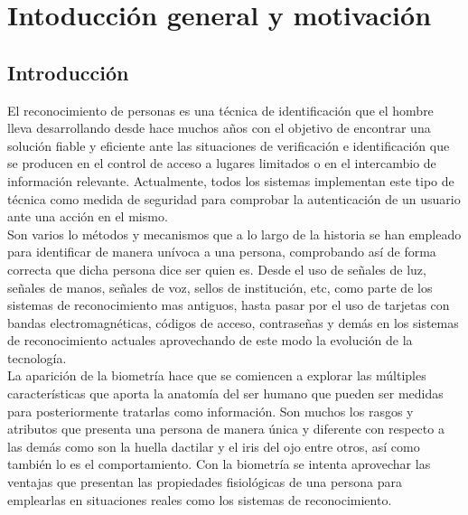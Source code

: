 
\chapter{Intoducción general y motivación} %

\label{Capítulo 1} %




\section{Introducción}
El reconocimiento de personas es una técnica de identificación que el hombre lleva desarrollando desde hace muchos años con el objetivo de encontrar una solución fiable y eficiente ante las situaciones de verificación e identificación que se producen en el control de acceso a lugares limitados o en el intercambio de información relevante. Actualmente, todos los sistemas implementan este tipo de técnica como medida de seguridad para comprobar la autenticación de un usuario ante una acción en el mismo. \\

Son varios lo métodos y mecanismos que a lo largo de la historia se han empleado para identificar de manera unívoca a una persona, comprobando así de forma correcta que dicha persona dice ser quien es. Desde el uso de señales de luz, señales de manos, señales de voz, sellos de institución, etc, como parte de los sistemas de reconocimiento mas antiguos, hasta pasar por el uso de tarjetas con bandas electromagnéticas, códigos de acceso, contraseñas y demás en los sistemas de reconocimiento actuales aprovechando de este modo la evolución de la tecnología.\\

La aparición de la biometría hace que se comiencen a explorar las múltiples características que aporta la anatomía del ser humano que pueden ser medidas para posteriormente tratarlas como información. Son muchos los rasgos y atributos que presenta una persona de manera única y diferente con respecto a las demás como son la huella dactilar y el iris del ojo entre otros, así como también lo es el comportamiento. Con la biometría se intenta aprovechar las ventajas que presentan las propiedades fisiológicas de una persona para emplearlas en situaciones reales como los sistemas de reconocimiento.\\

